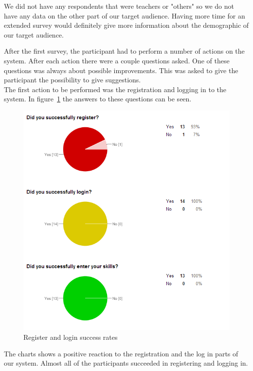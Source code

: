 We did not have any respondents that were teachers or "others" so we do not have any data on the other part of our target audience.
Having more time for an extended survey would definitely give more information about the demographic of our target audience.

After the first survey, the participant had to perform a number of actions on the system.
After each action there were a couple questions asked.
One of these questions was always about possible improvements.
This was asked to give the participant the possibility to give suggestions.\\
The first action to be performed was the registration and logging in to the system.
In figure~\ref{register_login_chart} the answers to these questions can be seen.\\
\begin{figure}[H]
    \centering
    \includegraphics[width=\textwidth]{images/register_login_chart}
    \caption{Register and login success rates}
    \label{register_login_chart}
\end{figure}

\newpage
The charts shows a positive reaction to the registration and the log in parts of our system.
Almost all of the participants succeeded in registering and logging in.

